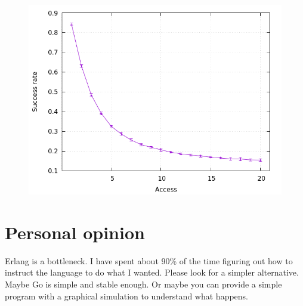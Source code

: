 \documentclass[a4paper, 11pt]{article}
\begin{document}
\nopagebreak
\begin{figure}[H]
\centering
\includegraphics[width=.8\linewidth]{exp2/a/fig.png}
\end{figure}




\section{Personal opinion}

Erlang is a bottleneck. I have spent about 90\% of the time figuring out how to 
instruct the language to do what I wanted. Please look for a simpler 
alternative. Maybe Go is simple and stable enough. Or maybe you can provide a 
simple program with a graphical simulation to understand what happens.
\end{document}
